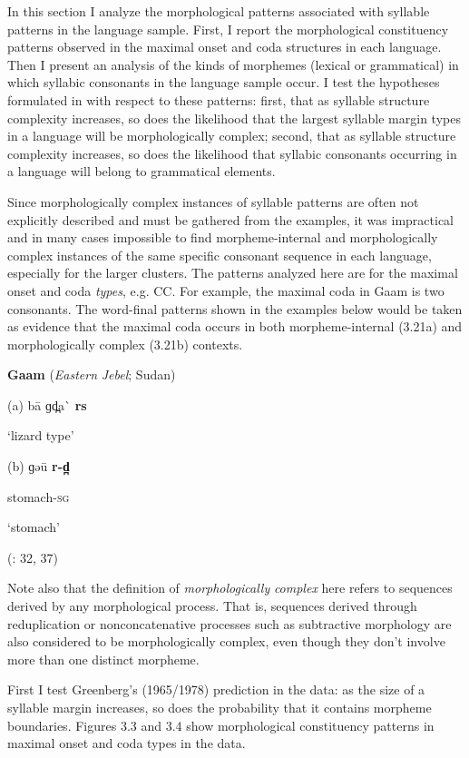   In this section I analyze the morphological patterns associated with syllable patterns in the language sample. First, I report the morphological constituency patterns observed in the maximal onset and coda structures in each language. Then I present an analysis of the kinds of morphemes (lexical or grammatical) in which syllabic consonants in the language sample occur. I test the hypotheses formulated in  with respect to these patterns: first, that as syllable structure complexity increases, so does the likelihood that the largest syllable margin types in a language will be morphologically complex; second, that as syllable structure complexity increases, so does the likelihood that syllabic consonants occurring in a language will belong to grammatical elements.

  Since morphologically complex instances of syllable patterns are often not explicitly described and must be gathered from the examples, it was impractical and in many cases impossible to find morpheme-internal and morphologically complex instances of the same specific consonant sequence in each language, especially for the larger clusters. The patterns analyzed here are for the maximal onset and coda \textit{types}, e.g. CC. For example, the maximal coda in Gaam is two consonants. The word-final patterns shown in the examples below would be taken as evidence that the maximal coda occurs in both morpheme-internal (3.21a) and morphologically complex (3.21b) contexts.

\ea\label{ex:(3.21)}
   \textbf{Gaam} (\textit{Eastern} \textit{Jebel}; Sudan)

(a)  ba\={} ɡd̪a\`{} \textbf{rs}

‘lizard type’

(b)  ɡəu\={} \textbf{r{}-d̪}

stomach-\textsc{sg}

‘stomach’

(\citealt{Stirtz2011}: 32, 37)

\z

  Note also that the definition of \textit{morphologically} \textit{complex} here refers to sequences derived by any morphological process. That is, sequences derived through reduplication or nonconcatenative processes such as subtractive morphology are also considered to be morphologically complex, even though they don’t involve more than one distinct morpheme.

  First I test Greenberg’s (1965/1978) prediction in the data: as the size of a syllable margin increases, so does the probability that it contains morpheme boundaries. Figures 3.3 and 3.4 show morphological constituency patterns in maximal onset and coda types in the data.

